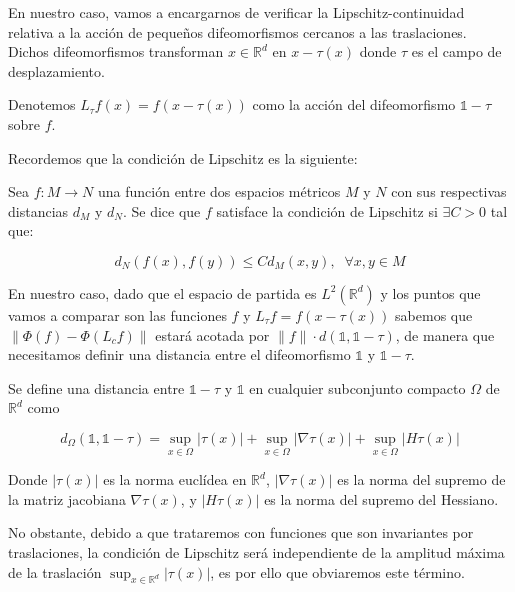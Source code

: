 \noindent En nuestro caso, vamos a encargarnos de verificar la Lipschitz-continuidad relativa a la acción de pequeños difeomorfismos cercanos a las traslaciones. Dichos difeomorfismos transforman $x \in \mathbb{R}^d$ en $x-\tau (x)$ donde $\tau$ es el campo de desplazamiento. 

\begin{definicion}
Denotemos $L_{\tau} f(x)=f(x-\tau(x))$ como la acción del difeomorfismo $\mathbb{1}-\tau$ sobre $f$.
\end{definicion} 

\medskip

\noindent Recordemos que la condición de Lipschitz es la siguiente: 

\begin{definicion}
  Sea $f: M \rightarrow N$ una función entre dos espacios métricos $M$ y $N$ con sus respectivas distancias $d_M$ y $d_N$. Se dice que $f$ satisface la condición de Lipschitz si $\exists C>0$ tal que: 

  $$d_N(f(x),f(y))\leq C d_M(x,y), \; \; \forall x,y \in M$$
\end{definicion}

\noindent En nuestro caso, dado que el espacio de partida es $L^2(\mathbb{R}^d)$ y los puntos que vamos a comparar son las funciones $f$ y $L_\tau f=f(x-\tau(x))$ sabemos que $\|\Phi(f) - \Phi(L_cf) \|$ estará acotada por $\|f\| · d(\mathbb{1}, \mathbb{1}-\tau)$, de manera que necesitamos definir una distancia entre el difeomorfismo $\mathbb{1}$ y $\mathbb{1}-\tau$. 

\begin{definicion}
Se define una distancia entre $\mathbb{1}-\tau$ y $\mathbb{1}$ en cualquier subconjunto compacto $\Omega$ de $\mathbb{R}^d$ como 

\begin{equation} \label{eq::distancia}
  d_\Omega(\mathbb{1},\mathbb{1}-\tau) = \sup_{x \in \Omega} |\tau (x)| + \sup_{x \in \Omega} |\nabla \tau (x)| + \sup_{x \in \Omega}|H \tau (x)|
\end{equation}

\end{definicion}
\medskip

\noindent Donde $|\tau (x)|$ es la norma euclídea en $\mathbb{R}^d$, $|\nabla \tau (x)|$ es la norma del supremo de la matriz jacobiana $\nabla \tau (x)$, y $|H \tau (x)|$ es la norma del supremo del Hessiano.

\medskip

\noindent No obstante, debido a que trataremos con funciones que son invariantes por traslaciones, la condición de Lipschitz será independiente de la amplitud máxima de la traslación $\sup_{x \in \mathbb{R}^d}|\tau (x)|$, es por ello que obviaremos este término. 

